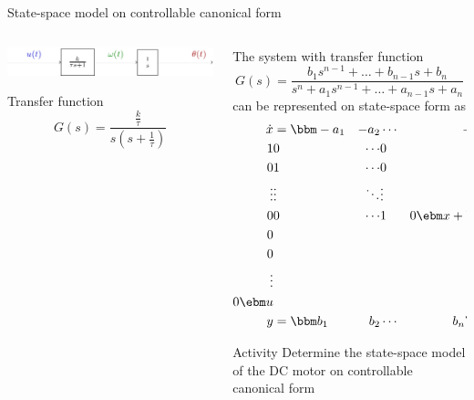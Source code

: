 \documentclass[presentation,aspectratio=169]{beamer}
\begin{document}
\begin{frame}[label={sec:org655345c}]{State-space model on controllable canonical form}
\begin{columns}
\begin{column}{0.4\columnwidth}
\begin{center}
  \includegraphics[width=\linewidth]{../../figures/block-DC}
\end{center}

Transfer function
\[G(s) = \frac{ \frac{k}{\tau}} {s( s + \frac{1}{\tau})}\]
\end{column}
\begin{column}{0.6\columnwidth}
The system with transfer function
\begin{equation*}
G(s)=\frac{b_1s^{n-1}+\dots+b_{n-1}s+b_n}{s^n+a_1s^{n-1}+\dots
  +a_{n-1}s+a_n}
\end{equation*}
can be represented on state-space form as
\begin{align*}
\dot{x}&=\bbm -a_1& -a_2& \cdots& -a_{n-1}& -a_n\\
1& 0& \cdots& 0& 0\\
0& 1& \cdots& 0& 0\\
\vdots& \vdots& \ddots& \vdots& \vdots\\
0& 0& \cdots& 1& 0\ebm x+
\bbm 1\\ 0\\ 0\\ \vdots\\ 0\ebm u\\
y&=\bbm b_1& b_2& \cdots& b_n\ebm x
\end{align*}

\pause

\alert{Activity} Determine the state-space model of the DC motor on controllable canonical form
\end{column}
\end{columns}
\end{frame}
\end{document}
